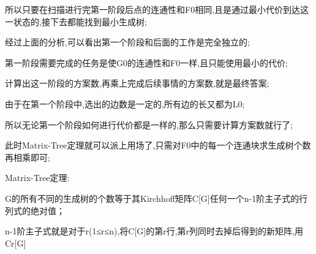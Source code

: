 所以只要在扫描进行完第一阶段后点的连通性和F0相同,且是通过最小代价到达这一状态的,接下去都能找到最小生成树;

经过上面的分析,可以看出第一个阶段和后面的工作是完全独立的;

第一阶段需要完成的任务是使G0的连通性和F0一样,且只能使用最小的代价;

计算出这一阶段的方案数,再乘上完成后续事情的方案数,就是最终答案;

由于在第一个阶段中,选出的边数是一定的,所有边的长又都为L0;

所以无论第一个阶段如何进行代价都是一样的,那么只需要计算方案数就行了;

此时Matrix-Tree定理就可以派上用场了,只需对F0中的每一个连通块求生成树个数再相乘即可;

Matrix-Tree定理:

G的所有不同的生成树的个数等于其Kirchhoff矩阵C[G]任何一个n-1阶主子式的行列式的绝对值；

n-1阶主子式就是对于r(1≤r≤n),将C[G]的第r行,第r列同时去掉后得到的新矩阵,用Cr[G]

